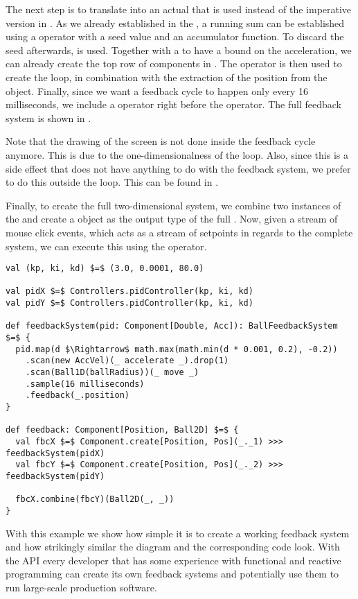 The next step is to translate  into an actual  that is used instead of the imperative version in . As we already established in the , a running sum can be established using a  operator with a seed value and an accumulator function. To discard the seed afterwards,  is used. Together with a  to have a bound on the acceleration, we can already create the top row of components in . The  operator is then used to create the loop, in combination with the extraction of the position from the  object. Finally, since we want a feedback cycle to happen only every 16 milliseconds, we include a  operator right before the  operator. The full feedback system is shown in .

Note that the drawing of the screen is not done inside the feedback cycle anymore. This is due to the one-dimensionalness of the loop. Also, since this is a side effect that does not have anything to do with the feedback system, we prefer to do this outside the loop. This can be found in .

Finally, to create the full two-dimensional system, we combine two instances of the  and create a  object as the output type of the full \comp. Now, given a stream of mouse click events, which acts as a stream of setpoints in regards to the complete system, we can execute this \comp using the  operator.

\begin{minipage}{\linewidth}
\begin{lstlisting}[style=ScalaStyle, caption={Ball movement feedback system}, label={lst:ball-feedback-new}]
val (kp, ki, kd) $=$ (3.0, 0.0001, 80.0)

val pidX $=$ Controllers.pidController(kp, ki, kd)
val pidY $=$ Controllers.pidController(kp, ki, kd)

def feedbackSystem(pid: Component[Double, Acc]): BallFeedbackSystem $=$ {
  pid.map(d $\Rightarrow$ math.max(math.min(d * 0.001, 0.2), -0.2))
    .scan(new AccVel)(_ accelerate _).drop(1)
    .scan(Ball1D(ballRadius))(_ move _)
    .sample(16 milliseconds)
    .feedback(_.position)
}

def feedback: Component[Position, Ball2D] $=$ {
  val fbcX $=$ Component.create[Position, Pos](_._1) >>> feedbackSystem(pidX)
  val fbcY $=$ Component.create[Position, Pos](_._2) >>> feedbackSystem(pidY)

  fbcX.combine(fbcY)(Ball2D(_, _))
}
\end{lstlisting}
\end{minipage}

With this example we show how simple it is to create a working feedback system and how strikingly similar the diagram and the corresponding code look. With the API every developer that has some experience with functional and reactive programming can create its own feedback systems and potentially use them to run large-scale production software.
